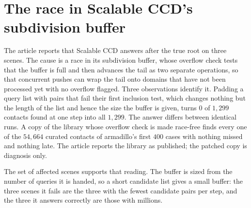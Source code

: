 \section{The race in Scalable CCD's subdivision buffer}
\label{sec:supp:race}

The article reports that Scalable CCD answers after the true root on three
scenes. The cause is a race in its subdivision buffer, whose overflow check
tests that the buffer is full and then advances the tail as two separate
operations, so that concurrent pushes can wrap the tail onto domains that have
not been processed yet with no overflow flagged. Three observations identify it.
Padding a query list with pairs that fail their first inclusion test, which
changes nothing but the length of the list and hence the size the buffer is
given, turns $0$ of $1{,}299$ contacts found at one step into all $1{,}299$. The
answer differs between identical runs. A copy of the library whose overflow
check is made race-free finds every one of the $54{,}664$ curated contacts of
armadillo's first $400$ cases with nothing missed and nothing late. The article
reports the library as published; the patched copy is diagnosis only.

The set of affected scenes supports that reading. The buffer is sized from the
number of queries it is handed, so a short candidate list gives a small buffer:
the three scenes it fails are the three with the fewest candidate pairs per step,
and the three it answers correctly are those with millions.






